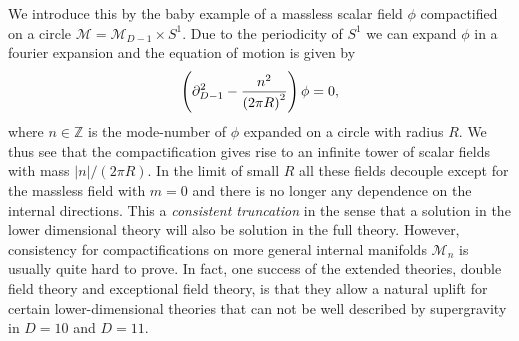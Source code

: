 We introduce this by the baby example of a massless scalar field $\phi$ compactified on a circle $\mathcal{M}=\mathcal{M}_{D-1}\times S^1$. Due to the periodicity of $S^1$ we can expand $\phi$ in a fourier expansion and the equation of motion is given by 
\begin{equation}
    \left(\partial^2_{D-1}-\frac{n^2}{\left(2\pi R\right)^2}\right)\phi = 0,
\end{equation}
where $n\in\mathbb{Z}$ is the mode-number of $\phi$ expanded on a circle with radius $R$. We thus see that the compactification gives rise to an infinite tower of scalar fields with mass $|n|/(2\pi R)$. In the limit of small $R$ all these fields decouple except for the massless field with $m=0$ and there is no longer any dependence on the internal directions. This a \emph{consistent truncation} in the sense that a solution in the lower dimensional theory will also be solution in the full theory. However, consistency for compactifications on more general internal manifolds $\mathcal{M}_n$ is usually quite hard to prove. In fact, one success of the extended theories, double field theory and exceptional field theory, is that they allow a natural uplift for certain lower-dimensional theories that can not be well described by supergravity in $D=10$ and $D=11$. 

